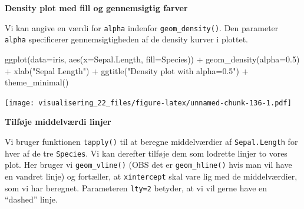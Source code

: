 \documentclass[
]{book}
\newenvironment{Shaded}{\begin{snugshade}}{\end{snugshade}}
\newcommand{\AttributeTok}[1]{\textcolor[rgb]{0.77,0.63,0.00}{#1}}
\newcommand{\DecValTok}[1]{\textcolor[rgb]{0.00,0.00,0.81}{#1}}
\newcommand{\FloatTok}[1]{\textcolor[rgb]{0.00,0.00,0.81}{#1}}
\newcommand{\FunctionTok}[1]{\textcolor[rgb]{0.00,0.00,0.00}{#1}}
\newcommand{\NormalTok}[1]{#1}
\newcommand{\OtherTok}[1]{\textcolor[rgb]{0.56,0.35,0.01}{#1}}
\newcommand{\SpecialCharTok}[1]{\textcolor[rgb]{0.00,0.00,0.00}{#1}}
\newcommand{\StringTok}[1]{\textcolor[rgb]{0.31,0.60,0.02}{#1}}
\begin{document}
\textbf{Density plot med fill og gennemsigtig farver}

Vi kan angive en værdi for \texttt{alpha} indenfor \texttt{geom\_density()}. Den parameter \texttt{alpha} specificerer gennemsigtigheden af de density kurver i plottet.

\begin{Shaded}
\begin{Highlighting}[]
\FunctionTok{ggplot}\NormalTok{(}\AttributeTok{data=}\NormalTok{iris, }\FunctionTok{aes}\NormalTok{(}\AttributeTok{x=}\NormalTok{Sepal.Length, }\AttributeTok{fill=}\NormalTok{Species)) }\SpecialCharTok{+} 
  \FunctionTok{geom\_density}\NormalTok{(}\AttributeTok{alpha=}\FloatTok{0.5}\NormalTok{) }\SpecialCharTok{+} 
  \FunctionTok{xlab}\NormalTok{(}\StringTok{"Sepal Length"}\NormalTok{) }\SpecialCharTok{+} 
  \FunctionTok{ggtitle}\NormalTok{(}\StringTok{"Density plot with alpha=0.5"}\NormalTok{) }\SpecialCharTok{+}
  \FunctionTok{theme\_minimal}\NormalTok{()}
\end{Highlighting}
\end{Shaded}

\texttt{[image: visualisering\_22\_files/figure-latex/unnamed-chunk-136-1.pdf]}

\textbf{Tilføje middelværdi linjer}

Vi bruger funktionen \texttt{tapply()} til at beregne middelværdier af \texttt{Sepal.Length} for hver af de tre \texttt{Species}. Vi kan derefter tilføje dem som lodrette linjer to vores plot. Her bruger vi \texttt{geom\_vline()} (OBS det er \texttt{geom\_hline()} hvis man vil have en vandret linje) og fortæller, at \texttt{xintercept} skal vare lig med de middelværdier, som vi har beregnet. Parameteren \texttt{lty=2} betyder, at vi vil gerne have en ``dashed'' linje.

\begin{Shaded}
\end{Shaded}
\end{document}
